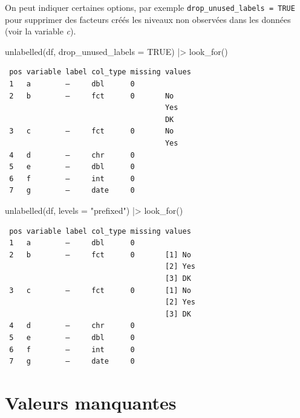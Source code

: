 \documentclass[
  letterpaper,
  DIV=11,
  numbers=noendperiod,
  oneside]{scrreprt}
\newenvironment{Shaded}{\begin{snugshade}}{\end{snugshade}}
\newcommand{\AttributeTok}[1]{\textcolor[rgb]{0.40,0.45,0.13}{#1}}
\newcommand{\ConstantTok}[1]{\textcolor[rgb]{0.56,0.35,0.01}{#1}}
\newcommand{\FunctionTok}[1]{\textcolor[rgb]{0.28,0.35,0.67}{#1}}
\newcommand{\NormalTok}[1]{\textcolor[rgb]{0.00,0.23,0.31}{#1}}
\newcommand{\SpecialCharTok}[1]{\textcolor[rgb]{0.37,0.37,0.37}{#1}}
\newcommand{\StringTok}[1]{\textcolor[rgb]{0.13,0.47,0.30}{#1}}
\begin{document}
On peut indiquer certaines options, par exemple
\texttt{drop\_unused\_labels\ =\ TRUE} pour supprimer des facteurs créés
les niveaux non observées dans les données (voir la variable \emph{c}).

\begin{Shaded}
\begin{Highlighting}[]
\FunctionTok{unlabelled}\NormalTok{(df, }\AttributeTok{drop\_unused\_labels =} \ConstantTok{TRUE}\NormalTok{) }\SpecialCharTok{|\textgreater{}} 
  \FunctionTok{look\_for}\NormalTok{()}
\end{Highlighting}
\end{Shaded}

\begin{verbatim}
 pos variable label col_type missing values
 1   a        —     dbl      0             
 2   b        —     fct      0       No    
                                     Yes   
                                     DK    
 3   c        —     fct      0       No    
                                     Yes   
 4   d        —     chr      0             
 5   e        —     dbl      0             
 6   f        —     int      0             
 7   g        —     date     0             
\end{verbatim}

\begin{Shaded}
\begin{Highlighting}[]
\FunctionTok{unlabelled}\NormalTok{(df, }\AttributeTok{levels =} \StringTok{"prefixed"}\NormalTok{) }\SpecialCharTok{|\textgreater{}} 
  \FunctionTok{look\_for}\NormalTok{()}
\end{Highlighting}
\end{Shaded}

\begin{verbatim}
 pos variable label col_type missing values 
 1   a        —     dbl      0              
 2   b        —     fct      0       [1] No 
                                     [2] Yes
                                     [3] DK 
 3   c        —     fct      0       [1] No 
                                     [2] Yes
                                     [3] DK 
 4   d        —     chr      0              
 5   e        —     dbl      0              
 6   f        —     int      0              
 7   g        —     date     0              
\end{verbatim}

\hypertarget{sec-valeurs-manquantes}{%
\chapter{Valeurs manquantes}\label{sec-valeurs-manquantes}}
\end{document}
